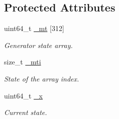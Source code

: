 \subsection*{Protected Attributes}
\begin{DoxyCompactItemize}
\item 
\mbox{\label{classvarfiles_1_1_generate_m_t_aec4535d146a95eb31d7fdcd16f6d7288}} 
uint64\+\_\+t \hyperlink{classvarfiles_1_1_generate_m_t_aec4535d146a95eb31d7fdcd16f6d7288}{\+\_\+mt} \mbox{[}312\mbox{]}
\begin{DoxyCompactList}\small\item\em Generator state array. \end{DoxyCompactList}\item 
\mbox{\label{classvarfiles_1_1_generate_m_t_a21519361a11932c041ee294d57105f0f}} 
size\+\_\+t \hyperlink{classvarfiles_1_1_generate_m_t_a21519361a11932c041ee294d57105f0f}{\+\_\+mti}
\begin{DoxyCompactList}\small\item\em State of the array index. \end{DoxyCompactList}\item 
\mbox{\label{classvarfiles_1_1_generate_m_t_a9d809351c0b388e43d4d188fca519877}} 
uint64\+\_\+t \hyperlink{classvarfiles_1_1_generate_m_t_a9d809351c0b388e43d4d188fca519877}{\+\_\+x}
\begin{DoxyCompactList}\small\item\em Current state. \end{DoxyCompactList}\end{DoxyCompactItemize}
